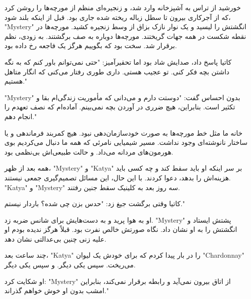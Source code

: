 خورشید از تراس به آشپزخانه وارد شد، و زنجیره‌ای منظم از مورچه‌ها را روشن کرد که از آجرکاری بیرون تا سطل زباله ریخته شده جاری بود. قبل از اینکه بلند شود، "Mystery" انگشتش را لیسید و یک نوار نازک بزاق از وسط زنجیره کشید. مورچه‌ها در نقطه شکست در همه جهات گریختند. مورچه‌ها دوباره به صف برگشتند. به زودی، نظم برقرار شد. سخت بود که بگوییم هرگز یک فاجعه رخ داده بود.

کاتیا پاسخ داد، صدایش شاد بود اما تحقیرآمیز: "حتی نمی‌توانم باور کنم که به نگه داشتن بچه فکر کنی. تو عجیب هستی. داری طوری رفتار می‌کنی که انگار متاهل هستیم."

"Mystery" بدون احساس گفت: "دوستت دارم و می‌دانی که مأموریت زندگی‌ام بقا و تکثیر است. بنابراین، هیچ ضرری در آوردن بچه نمی‌بینم. آماده‌ام که نصف تعهدم را انجام دهم."

خانه ما مثل خط مورچه‌ها به صورت خودسازمان‌دهی نبود. هیچ کمربند فرماندهی و یا ساختار نانوشته‌ای وجود نداشت. مسیر شیمیایی نامرئی که همه ما دنبال می‌کردیم بوی هورمون‌های مردانه می‌داد. و حالت طبیعی‌اش بی‌نظمی بود.

همه بعد از ظهر، "Mystery" و "Katya" بر سر اینکه او باید سقط کند و چه کسی باید هزینه‌اش را بدهد، دعوا کردند. با این حال، این مسائل تصمیم‌گیری جمعی نیستند. "Katya" و "Mystery" سه روز بعد به کلینیک سقط جنین رفتند.

کاتیا وقتی برگشت جیغ زد: "حدس بزن چی شده؟ باردار نیستم."

او به هوا پرید و به دست‌هایش برای شانس ضربه زد. "Mystery" پشتش ایستاد و انگشتش را به او نشان داد. نگاه صورتش خالص نفرت بود. قبلاً هرگز ندیده بودم او علیه زنی چنین بی‌عدالتی نشان دهد.

چند ساعت بعد، "Katya" را در بار پیدا کردم که برای خودش یک لیوان "Chardonnay" می‌ریخت. سپس یکی دیگر. و سپس یکی دیگر.

او شکایت کرد: "Mystery" از اتاق بیرون نمی‌آید و رابطه برقرار نمی‌کند، بنابراین امشب بدون او خوش خواهم گذراند."